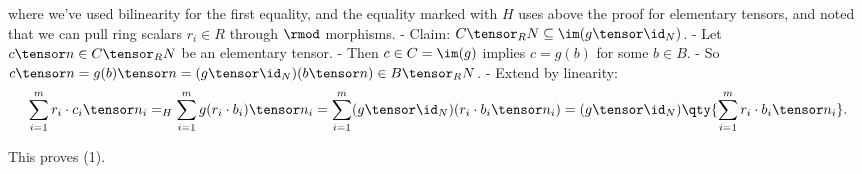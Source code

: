 where we've used bilinearity for the first equality, and the equality
marked with \(H\) uses above the proof for elementary tensors, and noted
that we can pull ring scalars \(r_i\in R\) through \(\rmod\) morphisms.
- Claim: \(C \tensor_R N \subseteq \im(g\tensor \id_N)\). - Let
\(c\tensor n \in C\tensor_R N\) be an elementary tensor. - Then
\(c\in C = \im(g)\) implies \(c = g(b)\) for some \(b\in B\). - So
\(c\tensor n = g(b) \tensor n = (g\tensor \id_N)(b\tensor n) \in B\tensor_R N\).
- Extend by linearity: \begin{align*}
  \sum_{i=1}^m r_i\cdot c_i \tensor n_i =_H \sum_{i=1}^m g(r_i\cdot b_i) \tensor n_i = \sum_{i=1}^m (g\tensor \id_N)(r_i\cdot b_i \tensor n_i) = (g\tensor \id_N)\qty{\sum_{i=1}^m r_i\cdot b_i \tensor n_i}
  .\end{align*}

This proves (1).


